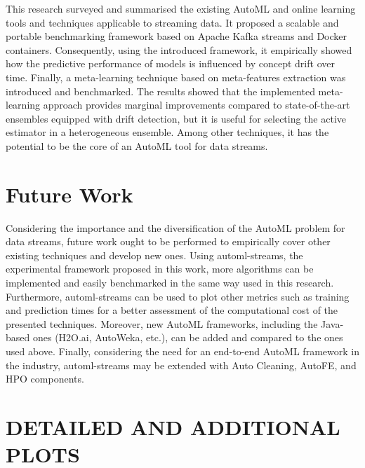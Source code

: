 \documentclass{sig-alternate-br}
\begin{document}
This research surveyed and summarised the existing AutoML and online learning tools and techniques applicable to streaming data. It proposed a scalable and portable benchmarking framework based on Apache Kafka streams and Docker containers. Consequently, using the introduced framework, it empirically showed how the predictive performance of models is influenced by concept drift over time. Finally, a meta-learning technique based on meta-features extraction was introduced and benchmarked. The results showed that the implemented meta-learning approach provides marginal improvements compared to state-of-the-art ensembles equipped with drift detection, but it is useful for selecting the active estimator in a heterogeneous ensemble.  Among other techniques, it has the potential to be the core of an AutoML tool for data streams.

\section{Future Work}

Considering the importance and the diversification of the AutoML problem for data streams, future work ought to be performed to empirically cover other existing techniques and develop new ones. Using automl-streams, the experimental framework proposed in this work, more algorithms can be implemented and easily benchmarked in the same way used in this research. Furthermore, automl-streams can be used to plot other metrics such as training and prediction times for a better assessment of the computational cost of the presented techniques. Moreover, new AutoML frameworks, including the Java-based ones (H2O.ai, AutoWeka, etc.), can be added and compared to the ones used above. Finally, considering the need for an end-to-end AutoML framework in the industry, automl-streams may be extended with Auto Cleaning, AutoFE, and HPO components.


  
%

\newpage

\appendix
\section{DETAILED AND ADDITIONAL PLOTS}
\label{appendix:a}
\end{document}
